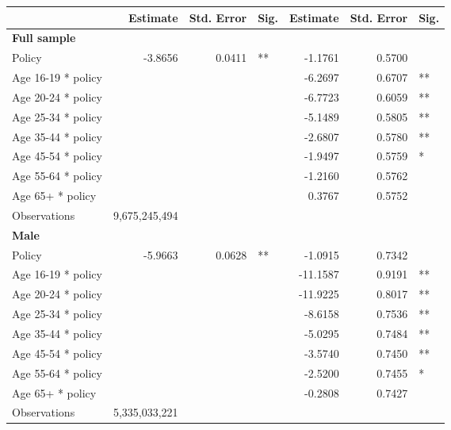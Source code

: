 
\begin{table}%
\centering 
\begin{tabular}{l r r l r r l} 

\hline 
 
 & Estimate & Std. Error & Sig. & Estimate & Std. Error & Sig. \\ 

\hline 
 
\textbf{Full sample} \\ 

Policy             &  -3.8656        &  0.0411       &   **       &  -1.1761        &  0.5700       &            \\ 
Age 16-19 * policy           & & &  &  -6.2697        &  0.6707       &   **       \\ 
Age 20-24 * policy           & & &  &  -6.7723        &  0.6059       &   **       \\ 
Age 25-34 * policy           & & &  &  -5.1489        &  0.5805       &   **       \\ 
Age 35-44 * policy           & & &  &  -2.6807        &  0.5780       &   **       \\ 
Age 45-54 * policy           & & &  &  -1.9497        &  0.5759       &    *       \\ 
Age 55-64 * policy           & & &  &  -1.2160        &  0.5762       &            \\ 
Age 65+ * policy           & & &  &  0.3767        &  0.5752       &            \\ 
Observations & 9,675,245,494 \\ 


\hline 

\textbf{Male} \\ 

Policy             &  -5.9663        &  0.0628       &   **       &  -1.0915        &  0.7342       &            \\ 
Age 16-19 * policy           & & &  &  -11.1587        &  0.9191       &   **       \\ 
Age 20-24 * policy           & & &  &  -11.9225        &  0.8017       &   **       \\ 
Age 25-34 * policy           & & &  &  -8.6158        &  0.7536       &   **       \\ 
Age 35-44 * policy           & & &  &  -5.0295        &  0.7484       &   **       \\ 
Age 45-54 * policy           & & &  &  -3.5740        &  0.7450       &   **       \\ 
Age 55-64 * policy           & & &  &  -2.5200        &  0.7455       &    *       \\ 
Age 65+ * policy           & & &  &  -0.2808        &  0.7427       &            \\ 
Observations & 5,335,033,221 \\ 



\end{tabular}
\end{table}
